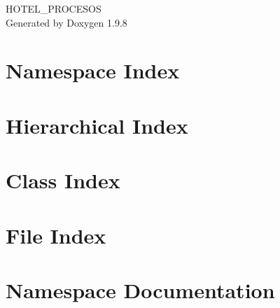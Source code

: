 \documentclass[twoside]{book}
\newcommand{\+}{\discretionary{\mbox{\scriptsize$\hookleftarrow$}}{}{}}
\newcommand{\clearemptydoublepage}{%
    \newpage{\pagestyle{empty}\cleardoublepage}%
  }
\begin{document}
  \raggedbottom
    \hypersetup{pageanchor=false,
                bookmarksnumbered=true,
                pdfencoding=unicode
               }
  \begin{titlepage}
  \vspace*{7cm}
  \begin{center}%
  {\Large HOTEL\+\_\+\+PROCESOS}\\
  \vspace*{1cm}
  {\large Generated by Doxygen 1.9.8}\\
  \end{center}
  \end{titlepage}
  \clearemptydoublepage
  \tableofcontents
  \clearemptydoublepage
  \hypersetup{pageanchor=true}
\chapter{Namespace Index}

\chapter{Hierarchical Index}

\chapter{Class Index}

\chapter{File Index}

\chapter{Namespace Documentation}











\end{document}
